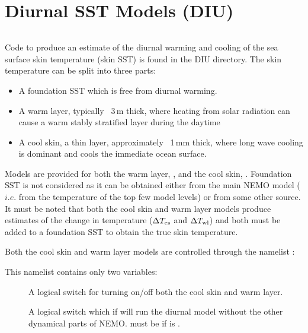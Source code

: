 \documentclass[../tex_main/NEMO_manual]{subfiles}
\begin{document}
\chapter{Diurnal SST Models (DIU)}
\label{chap:DIU}

\minitoc


\newpage
$\ $\newline %

Code to produce an estimate of the diurnal warming and cooling of the sea surface skin
temperature (skin SST) is found in the DIU directory.  
The skin temperature can be split into three parts:
\begin{itemize}
\item A foundation SST which is free from diurnal warming.
\item A warm layer, typically ~3\,m thick, where heating from solar radiation can
cause a warm stably stratified layer during the daytime
\item A cool skin, a thin layer, approximately ~1\,mm thick, where long wave cooling
is dominant and cools the immediate ocean surface.
\end{itemize}

Models are provided for both the warm layer, , and the cool skin,
.  Foundation SST is not considered as it can be obtained
either from the main NEMO model ($i.e.$ from the temperature of the top few model levels)
or from some other source.  
It must be noted that both the cool skin and warm layer models produce estimates of 
the change in temperature ($\Delta T_{\rm{cs}}$ and $\Delta T_{\rm{wl}}$) 
and both must be added to a foundation SST to obtain the true skin temperature.

Both the cool skin and warm layer models are controlled through the namelist :

This namelist contains only two variables:
\begin{description}
\item[] A logical switch for turning on/off both the cool skin and warm layer.
\item[] A logical switch which if  will run the diurnal model
without the other dynamical parts of NEMO.  
 must be  if  is .
\end{description}
\end{document}
